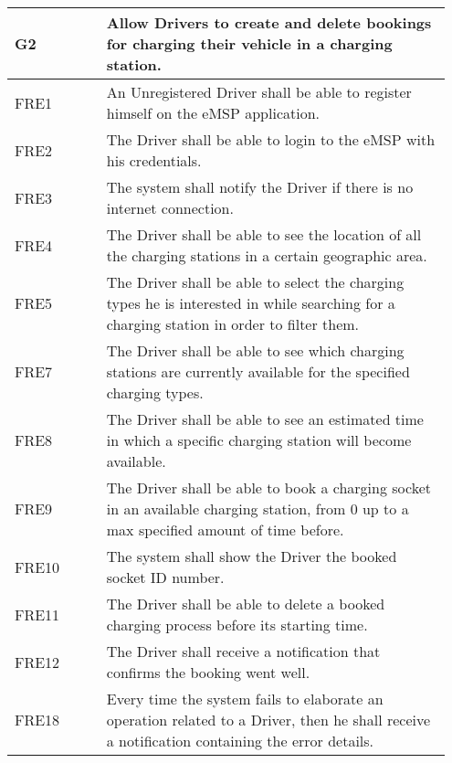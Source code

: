 {\renewcommand{\arraystretch}{1.5}
\begin{longtable}{|p{0.20\linewidth}p{0.75\linewidth}|}
    \hline
    \rowcolor{bluepoli!40}\textbf{G2} & \textbf{Allow Drivers to create and delete bookings for charging their vehicle in a charging station.} \\
    \hline
    \rowcolor{bluepoli!15} FRE1 & An Unregistered Driver shall be able to register himself on the eMSP application. \\
    \hline
    \rowcolor{bluepoli!15} FRE2 & The Driver shall be able to login to the eMSP with his credentials. \\
    \hline 
    \rowcolor{bluepoli!15} FRE3 & The system shall notify the Driver if there is no internet connection. \\
    \hline 
    \rowcolor{bluepoli!15} FRE4 & The Driver shall be able to see the location of all the charging stations in a certain geographic area. \\
    \hline 
    \rowcolor{bluepoli!15} FRE5 & The Driver shall be able to select the charging types he is interested in while searching for a charging station in order to filter them. \\
    \hline 
    \rowcolor{bluepoli!15} FRE7 & The Driver shall be able to see which charging stations are currently available for the specified charging types. \\
    \hline  
    \rowcolor{bluepoli!15} FRE8 & The Driver shall be able to see an estimated time in which a specific charging station will become available. \\
    \hline  
    \rowcolor{bluepoli!15} FRE9 & The Driver shall be able to book a charging socket in an available charging station, from 0 up to a max specified amount of time before.\\
    \hline
    \rowcolor{bluepoli!15} FRE10 & The system shall show the Driver the booked socket ID number. \\
    \hline
    \rowcolor{bluepoli!15} FRE11 &  The Driver shall be able to delete a booked charging process before its starting time.\\
    \hline
    \rowcolor{bluepoli!15} FRE12 & The Driver shall receive a notification that confirms the booking went well. \\
    \hline
    \rowcolor{bluepoli!15} FRE18 & Every time the system fails to elaborate an operation related to a Driver, then he shall receive a notification containing the error details. \\

\end{longtable}}

